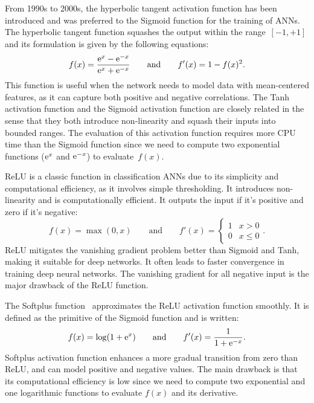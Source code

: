 \documentclass[algorithms,article,submit,pdftex,oneauthors]{Definitions/mdpi}
\DeclareRobustCommand{\e}[1]{{\rm e}^{#1}}
\begin{document}
\textcolor{greencolor}{From 1990s to 2000s, the hyperbolic tangent activation function has been introduced and was preferred to the Sigmoid function for the training of ANNs.}
The hyperbolic tangent function squashes the output within the range~$[-1,+1]$ and its formulation is given by the following equations:
\begin{equation}
f(x) = \frac{\e{x} - \e{-x}}{\e{x} + \e{-x}}\qquad \text{and}\qquad f'(x) = 1 - f(x)^2.\label{eq:act-tanh}
\end{equation}
This function is useful when the network needs to model data with mean-centered features, as it can capture both positive and negative correlations.
The Tanh activation function and the Sigmoid activation function are closely related in the sense that they both introduce non-linearity and squash their inputs into bounded ranges.
The evaluation of this activation function requires more CPU time than the Sigmoid function since we need to compute two exponential functions ($\e{x}$ and $\e{-x}$) to evaluate~$f(x)$.

ReLU is a classic function in classification ANNs due to its simplicity and computational efficiency, as it involves simple thresholding.
It introduces non-linearity and is computationally efficient.
It outputs the input if it's positive and zero if it's negative:
\begin{equation}
f(x) = \max(0,x)\qquad \text{and}\qquad f'(x) =
\begin{cases}
1&x>0\\
0&x\le 0
\end{cases}.\label{eq:act-relu}
\end{equation}
ReLU mitigates the vanishing gradient problem better than Sigmoid and Tanh, making it suitable for deep networks.
It often leads to faster convergence in training deep neural networks.
\textcolor{greencolor}{The vanishing gradient for all negative input is the major drawback of the ReLU function.}

The Softplus function~\cite{Dugas-2000-ISO} approximates the ReLU activation function smoothly.
It is defined as the primitive of the Sigmoid function and is written:
\begin{equation}
f(x) = \log\left(1+\e{x}\right)\qquad \text{and}\qquad f'(x) = \frac{1}{1+\e{-x}}.\label{eq:act-softplus}
\end{equation}
Softplus activation function enhances a more gradual transition from zero than ReLU, and can model positive and negative values.
The main drawback is that its computational efficiency is low since we need to compute two exponential and one logarithmic functions to evaluate $f(x)$ and its derivative.
\end{document}

